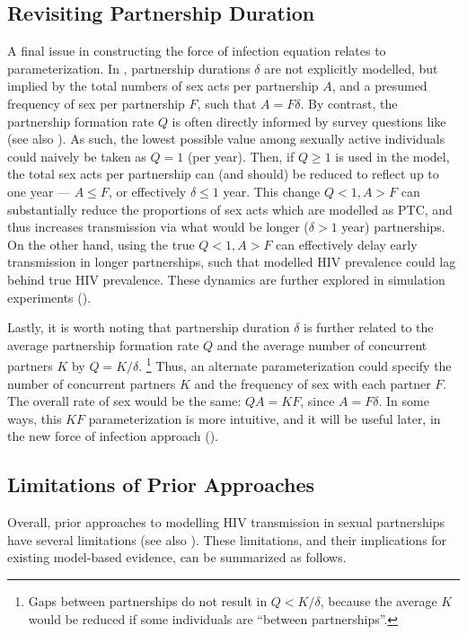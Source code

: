 \subsection{Revisiting Partnership Duration}\label{foi.prior.dur}
A final issue in constructing the force of infection equation relates to parameterization.
In , partnership durations $\delta$ are not explicitly modelled,
but implied by the total numbers of sex acts per partnership $A$,
and a presumed frequency of sex per partnership $F$, such that $A = F\delta$.
By contrast, the partnership formation rate $Q$ is often directly informed by survey questions like
(see also ).
As such, the lowest possible value among sexually active individuals
could naively be taken as $Q = 1$ (per year).
Then, if $Q \ge 1$ is used in the model,
the total sex acts per partnership can (and should) be reduced to reflect up to one year
--- \ie $A \le F$, or effectively $\delta \le 1$ year.
This change \vs $Q < 1, A > F$
can substantially reduce the proportions of sex acts which are modelled as PTC,
and thus increases transmission via what would be longer ($\delta > 1$ year) partnerships.
On the other hand, using the true $Q < 1, A > F$
can effectively delay early transmission in longer partnerships,
such that modelled HIV prevalence could lag behind true HIV prevalence.
These dynamics are further explored in simulation experiments ().
\par
Lastly, it is worth noting that partnership duration $\delta$ is further related to
the average partnership formation rate $Q$ and
the average number of concurrent partners $K$ by $Q = K/\delta$.%
\footnote{Gaps between partnerships do not result in $Q < K/\delta$,
  because the average $K$ would be reduced if some individuals are ``between partnerships''.}
Thus, an alternate parameterization could specify
the number of concurrent partners $K$ and the frequency of sex with each partner $F$.
The overall rate of sex would be the same: $QA = KF$, since $A = F\delta$.
In some ways, this $KF$ parameterization is more intuitive,
and it will be useful later, in the new force of infection approach ().
\subsection{Limitations of Prior Approaches}\label{foi.prior.lims}
Overall, prior approaches to modelling HIV transmission in sexual partnerships
have several limitations (see also \cite{Rao2021}).
These limitations, and their implications for existing model-based evidence,
can be summarized as follows.
